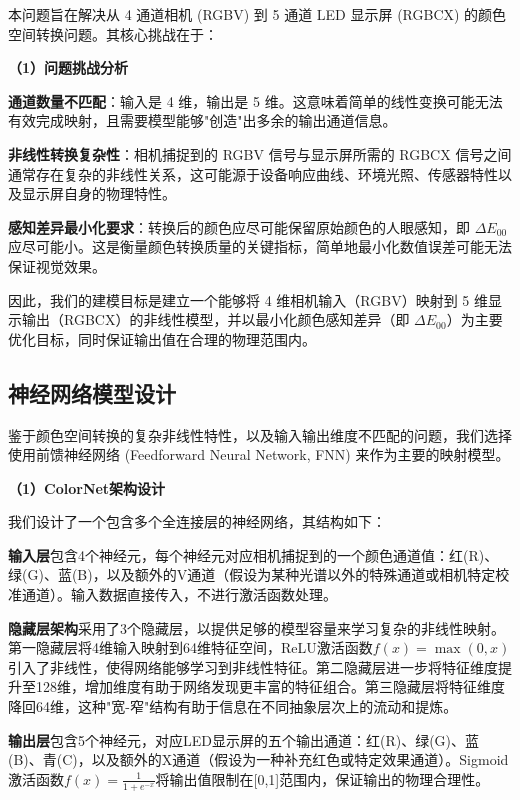 本问题旨在解决从 4 通道相机 (RGBV) 到 5 通道 LED 显示屏 (RGBCX) 的颜色空间转换问题。其核心挑战在于：

\noindent\textbf{（1）问题挑战分析}

 \textbf{通道数量不匹配}：输入是 4 维，输出是 5 维。这意味着简单的线性变换可能无法有效完成映射，且需要模型能够"创造"出多余的输出通道信息。

 \textbf{非线性转换复杂性}：相机捕捉到的 RGBV 信号与显示屏所需的 RGBCX 信号之间通常存在复杂的非线性关系，这可能源于设备响应曲线、环境光照、传感器特性以及显示屏自身的物理特性。

 \textbf{感知差异最小化要求}：转换后的颜色应尽可能保留原始颜色的人眼感知，即 $\Delta E_{00}$ 应尽可能小。这是衡量颜色转换质量的关键指标，简单地最小化数值误差可能无法保证视觉效果。

因此，我们的建模目标是建立一个能够将 4 维相机输入（RGBV）映射到 5 维显示输出（RGBCX）的非线性模型，并以最小化颜色感知差异（即 $\Delta E_{00}$）为主要优化目标，同时保证输出值在合理的物理范围内。

\subsection[\hspace{-2pt}神经网络模型设计]{{\heiti{} \hspace{-8pt}神经网络模型设计}}\label{section2: 神经网络模型设计}

鉴于颜色空间转换的复杂非线性特性，以及输入输出维度不匹配的问题，我们选择使用前馈神经网络 (Feedforward Neural Network, FNN) 来作为主要的映射模型。

\noindent\textbf{（1）ColorNet架构设计}

我们设计了一个包含多个全连接层的神经网络，其结构如下：

\textbf{输入层}包含4个神经元，每个神经元对应相机捕捉到的一个颜色通道值：红(R)、绿(G)、蓝(B)，以及额外的V通道（假设为某种光谱以外的特殊通道或相机特定校准通道）。输入数据直接传入，不进行激活函数处理。

\textbf{隐藏层架构}采用了3个隐藏层，以提供足够的模型容量来学习复杂的非线性映射。第一隐藏层将4维输入映射到64维特征空间，ReLU激活函数$f(x) = \max(0, x)$引入了非线性，使得网络能够学习到非线性特征。第二隐藏层进一步将特征维度提升至128维，增加维度有助于网络发现更丰富的特征组合。第三隐藏层将特征维度降回64维，这种"宽-窄"结构有助于信息在不同抽象层次上的流动和提炼。

\textbf{输出层}包含5个神经元，对应LED显示屏的五个输出通道：红(R)、绿(G)、蓝(B)、青(C)，以及额外的X通道（假设为一种补充红色或特定效果通道）。Sigmoid激活函数$f(x) = \frac{1}{1+e^{-x}}$将输出值限制在[0,1]范围内，保证输出的物理合理性。

